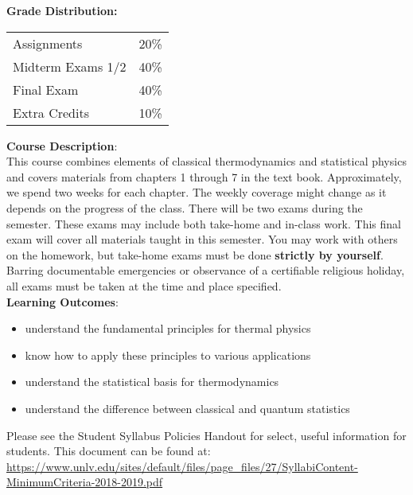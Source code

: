 \textbf {Grade Distribution:} \\
\begin{tabular}{ l l }
Assignments        & 20\% \\
Midterm Exams 1/2  & 40\% \\
Final Exam         & 40\% \\
Extra Credits      & 10\% \\
\end{tabular} 

\textbf {\large Course Description}:\\
This course combines elements of classical thermodynamics and statistical physics and covers materials from chapters 1 through 7 in the text book. Approximately, we spend two weeks for each chapter. The weekly coverage might change as it depends on the progress of the class. There will be two exams during the semester. These exams may include both take-home and in-class work. This final exam will cover all materials taught in this semester. You may work with others on the homework, but take-home exams must be done {\bf strictly by yourself}. Barring documentable emergencies or observance of a certifiable religious holiday, all exams must be taken at the time and place specified.
\\
\textbf {Learning Outcomes}:
\begin{itemize} 
\item understand the fundamental principles for thermal physics
\item know how to apply these principles to various applications
\item understand the statistical basis for thermodynamics
\item understand the difference between classical and quantum statistics
\end{itemize}

Please see the Student Syllabus Policies Handout for select, useful information for students. This document can be found at:\\ \url{https://www.unlv.edu/sites/default/files/page_files/27/SyllabiContent-MinimumCriteria-2018-2019.pdf}
%

